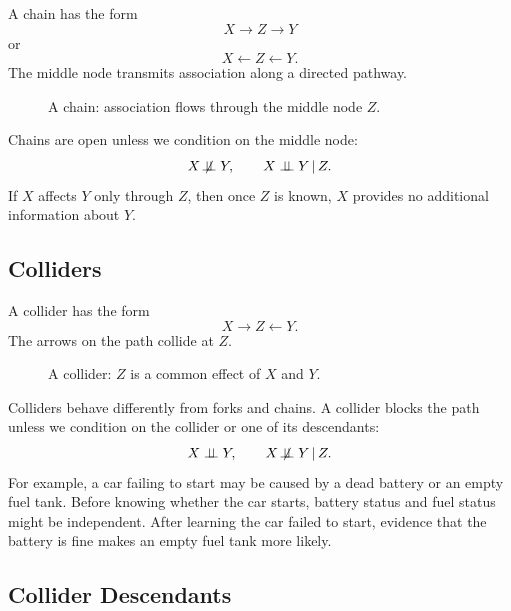 A chain has the form
\[
X\to Z\to Y
\]
or
\[
X\leftarrow Z\leftarrow Y.
\]
The middle node transmits association along a directed pathway.

\begin{figure}[H]
\centering
{}
\caption{A chain: association flows through the middle node $Z$.}
\end{figure}

Chains are open unless we condition on the middle node:
\[
X\not\!\perp\!\!\!\perp Y,
\qquad
X\perp\!\!\!\perp Y\,\vert\, Z.
\]
If $X$ affects $Y$ only through $Z$, then once $Z$ is known, $X$ provides no additional information about $Y$.

\subsection{Colliders}

A collider has the form
\[
X\to Z\leftarrow Y.
\]
The arrows on the path collide at $Z$.

\begin{figure}[H]
\centering
{}
\caption{A collider: $Z$ is a common effect of $X$ and $Y$.}
\end{figure}

Colliders behave differently from forks and chains. A collider blocks the path unless we condition on the collider or one of its descendants:
\[
X\perp\!\!\!\perp Y,
\qquad
X\not\!\perp\!\!\!\perp Y\,\vert\, Z.
\]
For example, a car failing to start may be caused by a dead battery or an empty fuel tank. Before knowing whether the car starts, battery status and fuel status might be independent. After learning the car failed to start, evidence that the battery is fine makes an empty fuel tank more likely.

\subsection{Collider Descendants}

